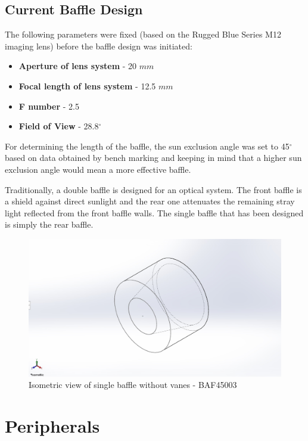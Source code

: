 \documentclass[../../main.tex]{subfiles}
\begin{document}
\subsection{Current Baffle Design}
The following parameters were fixed (based on the Rugged Blue Series M12 imaging lens) before the baffle design was initiated:
\begin{itemize}
    \item \textbf{Aperture of lens system} - 20 $mm$
    \item \textbf{Focal length of lens system} - 12.5 $mm$
    \item \textbf{F number} - 2.5
    \item \textbf{Field of View} - 28.8$^\circ$
\end{itemize}
\par
For determining the length of the baffle, the sun exclusion angle was set to 45$^\circ$ based on data obtained by bench marking and keeping in mind that a higher sun exclusion angle would mean a more effective baffle.
\par
Traditionally, a double baffle is designed for an optical system. The front baffle is a shield against direct sunlight and the rear one attenuates the remaining stray light reflected from the front baffle walls. The single baffle that has been designed is simply the rear baffle. 
\begin{figure}[H]
    \centering
    \includegraphics[width=\textwidth]{Figures/Instrumentation/single_baffle.jpg}
    \caption{Isometric view of single baffle without vanes - BAF45003}
    \label{fig:8.3}
\end{figure}

\section{Peripherals}
\end{document}

